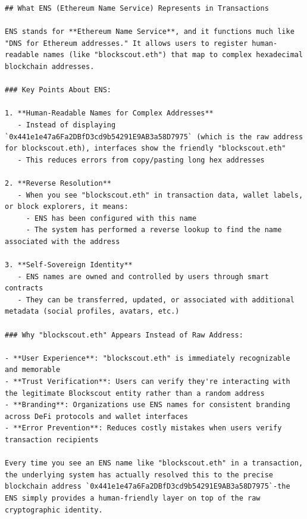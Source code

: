 \label{app:parsed-assistant-resonse}
\begin{verbatim}
## What ENS (Ethereum Name Service) Represents in Transactions

ENS stands for **Ethereum Name Service**, and it functions much like "DNS for Ethereum addresses." It allows users to register human-readable names (like "blockscout.eth") that map to complex hexadecimal blockchain addresses.

### Key Points About ENS:

1. **Human-Readable Names for Complex Addresses**
   - Instead of displaying `0x441e1e47a6Fa2DBfD3cd9b54291E9AB3a58D7975` (which is the raw address for blockscout.eth), interfaces show the friendly "blockscout.eth"
   - This reduces errors from copy/pasting long hex addresses

2. **Reverse Resolution**
   - When you see "blockscout.eth" in transaction data, wallet labels, or block explorers, it means:
     - ENS has been configured with this name
     - The system has performed a reverse lookup to find the name associated with the address

3. **Self-Sovereign Identity**
   - ENS names are owned and controlled by users through smart contracts
   - They can be transferred, updated, or associated with additional metadata (social profiles, avatars, etc.)

### Why "blockscout.eth" Appears Instead of Raw Address:

- **User Experience**: "blockscout.eth" is immediately recognizable and memorable
- **Trust Verification**: Users can verify they're interacting with the legitimate Blockscout entity rather than a random address
- **Branding**: Organizations use ENS names for consistent branding across DeFi protocols and wallet interfaces
- **Error Prevention**: Reduces costly mistakes when users verify transaction recipients

Every time you see an ENS name like "blockscout.eth" in a transaction, the underlying system has actually resolved this to the precise blockchain address `0x441e1e47a6Fa2DBfD3cd9b54291E9AB3a58D7975`-the ENS simply provides a human-friendly layer on top of the raw cryptographic identity.
\end{verbatim}